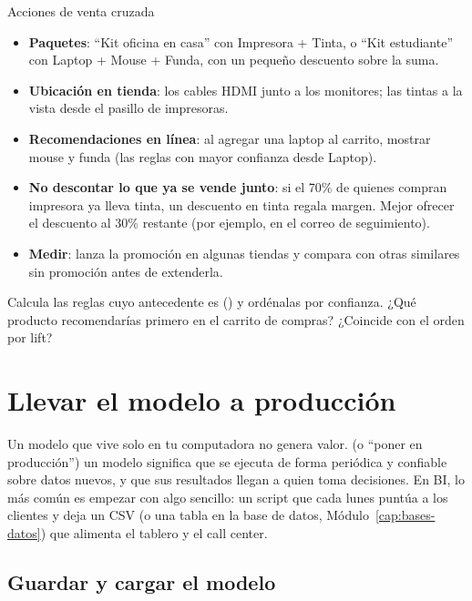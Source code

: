 \begin{negocio}{Acciones de venta cruzada}
\begin{itemize}
  \item \textbf{Paquetes}: ``Kit oficina en casa'' con Impresora + Tinta, o
        ``Kit estudiante'' con Laptop + Mouse + Funda, con un pequeño descuento
        sobre la suma.
  \item \textbf{Ubicación en tienda}: los cables HDMI junto a los monitores;
        las tintas a la vista desde el pasillo de impresoras.
  \item \textbf{Recomendaciones en línea}: al agregar una laptop al carrito,
        mostrar mouse y funda (las reglas con mayor confianza desde Laptop).
  \item \textbf{No descontar lo que ya se vende junto}: si el 70\% de quienes
        compran impresora ya lleva tinta, un descuento en tinta regala
        margen. Mejor ofrecer el descuento al 30\% restante (por ejemplo, en
        el correo de seguimiento).
  \item \textbf{Medir}: lanza la promoción en algunas tiendas y compara con
        otras similares sin promoción antes de extenderla.
\end{itemize}
\end{negocio}

\begin{hazlotu}
Calcula las reglas cuyo antecedente es 
() y ordénalas por confianza. ¿Qué
producto recomendarías primero en el carrito de compras? ¿Coincide con el orden
por lift?
\end{hazlotu}

\section{Llevar el modelo a producción}
\label{sec:m7-produccion}

Un modelo que vive solo en tu computadora no genera valor. 
(o ``poner en producción'') un modelo significa que se ejecuta de forma
periódica y confiable sobre datos nuevos, y que sus resultados llegan a quien
toma decisiones. En BI, lo más común es empezar con algo sencillo: un script
que cada lunes puntúa a los clientes y deja un CSV (o una tabla en la base de
datos, Módulo~\ref{cap:bases-datos}) que alimenta el tablero y el call center.

\subsection{Guardar y cargar el modelo}

